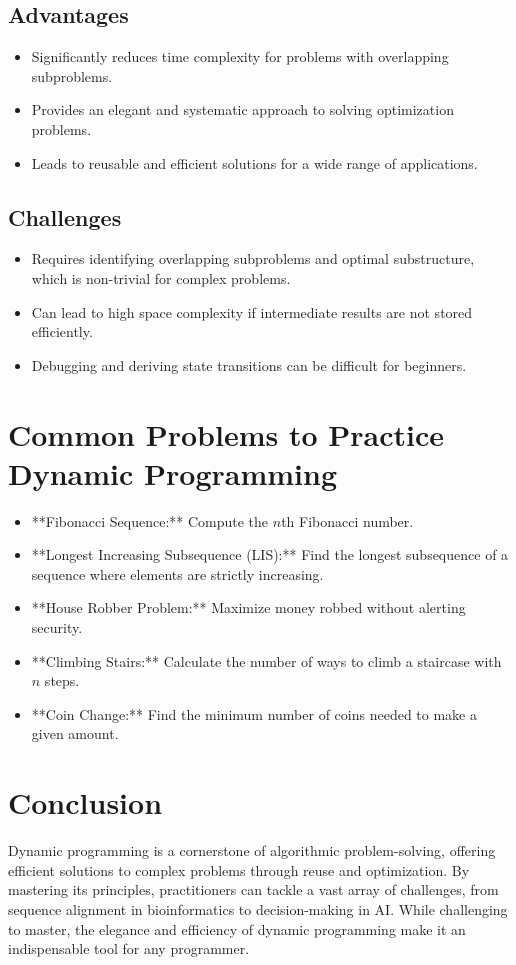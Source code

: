 \subsection*{Advantages}
\begin{itemize}
    \item Significantly reduces time complexity for problems with overlapping subproblems.
    \item Provides an elegant and systematic approach to solving optimization problems.
    \item Leads to reusable and efficient solutions for a wide range of applications.
\end{itemize}

\subsection*{Challenges}
\begin{itemize}
    \item Requires identifying overlapping subproblems and optimal substructure, which is non-trivial for complex problems.
    \item Can lead to high space complexity if intermediate results are not stored efficiently.
    \item Debugging and deriving state transitions can be difficult for beginners.
\end{itemize}

\section*{Common Problems to Practice Dynamic Programming}
\begin{itemize}
    \item **Fibonacci Sequence:** Compute the \(n\)th Fibonacci number.
    \item **Longest Increasing Subsequence (LIS):** Find the longest subsequence of a sequence where elements are strictly increasing.
    \item **House Robber Problem:** Maximize money robbed without alerting security.
    \item **Climbing Stairs:** Calculate the number of ways to climb a staircase with \(n\) steps.
    \item **Coin Change:** Find the minimum number of coins needed to make a given amount.
\end{itemize}

\section*{Conclusion}

Dynamic programming is a cornerstone of algorithmic problem-solving, offering efficient solutions to complex problems through reuse and optimization. By mastering its principles, practitioners can tackle a vast array of challenges, from sequence alignment in bioinformatics to decision-making in AI. While challenging to master, the elegance and efficiency of dynamic programming make it an indispensable tool for any programmer.